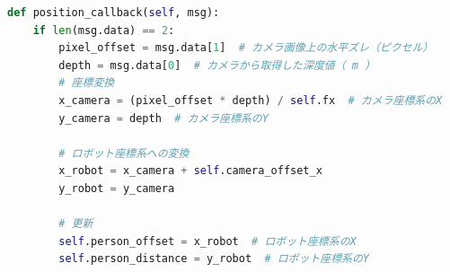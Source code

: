 \begin{lstlisting}[language=Python, caption=座標変換]
def position_callback(self, msg):
    if len(msg.data) == 2:  
        pixel_offset = msg.data[1]  # カメラ画像上の水平ズレ（ピクセル）
        depth = msg.data[0]  # カメラから取得した深度値（ m ）
        # 座標変換
        x_camera = (pixel_offset * depth) / self.fx  # カメラ座標系のX
        y_camera = depth  # カメラ座標系のY

        # ロボット座標系への変換
        x_robot = x_camera + self.camera_offset_x
        y_robot = y_camera

        # 更新
        self.person_offset = x_robot  # ロボット座標系のX
        self.person_distance = y_robot  # ロボット座標系のY
\end{lstlisting}


